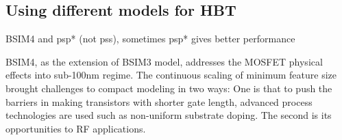 









\subsection{Using different models for HBT}

BSIM4 and psp* (not pss), sometimes psp* gives better performance

BSIM4, as the extension of BSIM3 model, addresses the MOSFET physical effects into sub-100nm regime. The continuous scaling of minimum feature size brought challenges to compact modeling in two ways: One is that to push the barriers in making transistors with shorter gate length, advanced process technologies are used such as non-uniform substrate doping. The second is its opportunities to RF applications.






